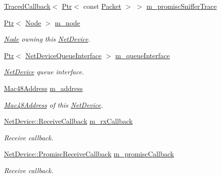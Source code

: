 \begin{DoxyCompactItemize}
\item 
\hyperlink{classns3_1_1TracedCallback}{Traced\+Callback}$<$ \hyperlink{classns3_1_1Ptr}{Ptr}$<$ const \hyperlink{classns3_1_1Packet}{Packet} $>$ $>$ \hyperlink{classns3_1_1PointToPointNetDevice_ad1f77c2c8a3e70210dfd89f0d4b670de}{m\+\_\+promisc\+Sniffer\+Trace}
\item 
\hyperlink{classns3_1_1Ptr}{Ptr}$<$ \hyperlink{classns3_1_1Node}{Node} $>$ \hyperlink{classns3_1_1PointToPointNetDevice_ae3af5dcf609954c77f468d24286a3bf7}{m\+\_\+node}
\begin{DoxyCompactList}\small\item\em \hyperlink{classns3_1_1Node}{Node} owning this \hyperlink{classns3_1_1NetDevice}{Net\+Device}. \end{DoxyCompactList}\item 
\hyperlink{classns3_1_1Ptr}{Ptr}$<$ \hyperlink{classns3_1_1NetDeviceQueueInterface}{Net\+Device\+Queue\+Interface} $>$ \hyperlink{classns3_1_1PointToPointNetDevice_a1999d3a69056c1a75aa67278982dfdfd}{m\+\_\+queue\+Interface}
\begin{DoxyCompactList}\small\item\em \hyperlink{classns3_1_1NetDevice}{Net\+Device} queue interface. \end{DoxyCompactList}\item 
\hyperlink{classns3_1_1Mac48Address}{Mac48\+Address} \hyperlink{classns3_1_1PointToPointNetDevice_ab5e476570bb9311ca53a457fc987bdb8}{m\+\_\+address}
\begin{DoxyCompactList}\small\item\em \hyperlink{classns3_1_1Mac48Address}{Mac48\+Address} of this \hyperlink{classns3_1_1NetDevice}{Net\+Device}. \end{DoxyCompactList}\item 
\hyperlink{classns3_1_1NetDevice_ad5e5e1ca187472bc2ba99575d8def568}{Net\+Device\+::\+Receive\+Callback} \hyperlink{classns3_1_1PointToPointNetDevice_aed5beceb5bce7b0653dde1371bb8d734}{m\+\_\+rx\+Callback}
\begin{DoxyCompactList}\small\item\em Receive callback. \end{DoxyCompactList}\item 
\hyperlink{classns3_1_1NetDevice_a427225795919f26c414bee2ea3f31ed2}{Net\+Device\+::\+Promisc\+Receive\+Callback} \hyperlink{classns3_1_1PointToPointNetDevice_aea1f86277e393aa99e45f7c1f18c6799}{m\+\_\+promisc\+Callback}
\begin{DoxyCompactList}\small\item\em Receive callback. \end{DoxyCompactList}\item 

\end{DoxyCompactItemize}
